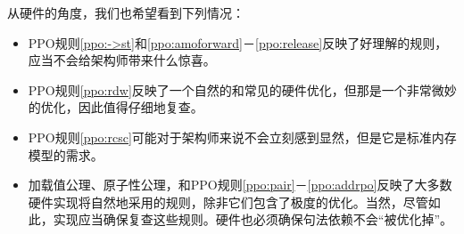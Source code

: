 

从硬件的角度，我们也希望看到下列情况：
\begin{itemize}
  \item PPO规则\ref{ppo:->st}和\ref{ppo:amoforward}－\ref{ppo:release}反映了好理解的规则，应当不会给架构师带来什么惊喜。
  \item PPO规则\ref{ppo:rdw}反映了一个自然的和常见的硬件优化，但那是一个非常微妙的优化，因此值得仔细地复查。
  \item PPO规则\ref{ppo:rcsc}可能对于架构师来说不会立刻感到显然，但是它是标准内存模型的需求。
  \item 加载值公理、原子性公理，和PPO规则\ref{ppo:pair}－\ref{ppo:addrpo}反映了大多数硬件实现将自然地采用的规则，除非它们包含了极度的优化。当然，尽管如此，实现应当确保复查这些规则。硬件也必须确保句法依赖不会“被优化掉”。
\end{itemize}

